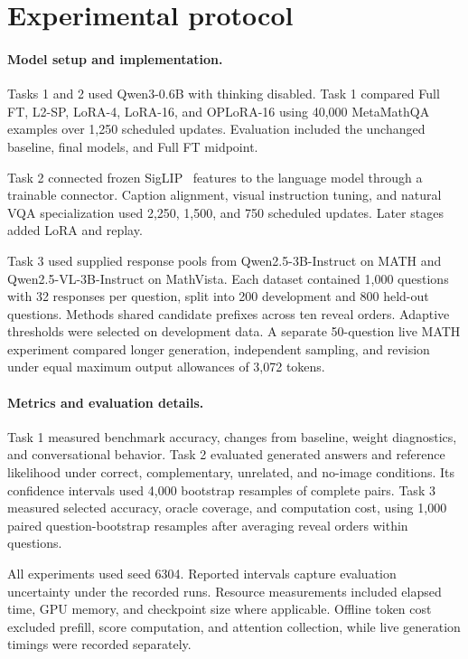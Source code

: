 \documentclass{article}
\begin{document}
\section{Experimental protocol}
\paragraph{Model setup and implementation.} Tasks 1 and 2 used Qwen3-0.6B with thinking disabled. Task 1 compared Full FT, L2-SP, LoRA-4, LoRA-16, and OPLoRA-16 using 40,000 MetaMathQA examples over 1,250 scheduled updates. Evaluation included the unchanged baseline, final models, and Full FT midpoint.

Task 2 connected frozen SigLIP~\citep{zhai2023siglip} features to the language model through a trainable connector. Caption alignment, visual instruction tuning, and natural VQA specialization used 2,250, 1,500, and 750 scheduled updates. Later stages added LoRA and replay.

Task 3 used supplied response pools from Qwen2.5-3B-Instruct on MATH and Qwen2.5-VL-3B-Instruct on MathVista. Each dataset contained 1,000 questions with 32 responses per question, split into 200 development and 800 held-out questions. Methods shared candidate prefixes across ten reveal orders. Adaptive thresholds were selected on development data. A separate 50-question live MATH experiment compared longer generation, independent sampling, and revision under equal maximum output allowances of 3,072 tokens.

\paragraph{Metrics and evaluation details.} Task 1 measured benchmark accuracy, changes from baseline, weight diagnostics, and conversational behavior. Task 2 evaluated generated answers and reference likelihood under correct, complementary, unrelated, and no-image conditions. Its confidence intervals used 4,000 bootstrap resamples of complete pairs. Task 3 measured selected accuracy, oracle coverage, and computation cost, using 1,000 paired question-bootstrap resamples after averaging reveal orders within questions.

All experiments used seed 6304. Reported intervals capture evaluation uncertainty under the recorded runs. Resource measurements included elapsed time, GPU memory, and checkpoint size where applicable. Offline token cost excluded prefill, score computation, and attention collection, while live generation timings were recorded separately.
\end{document}
